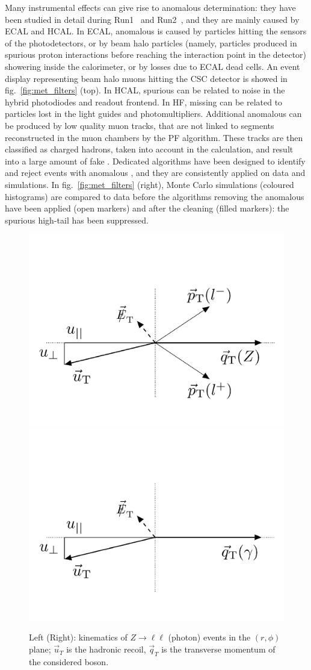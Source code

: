 \noindent Many instrumental effects can give rise to anomalous \MET determination: they have been studied in detail during Run1~\cite{Chatrchyan:2011tn,CMS:vgm} and Run2~\cite{CMS:2016ljj}, and they are mainly caused by ECAL and HCAL. In ECAL, anomalous \met is caused by particles hitting the sensors of the photodetectors, or by beam halo particles (namely, particles produced in spurious proton interactions before reaching the interaction point in the detector) showering inside the calorimeter, or by losses due to ECAL dead cells. An event display representing beam halo muons hitting the CSC detector is showed in fig.~\ref{fig:met_filters} (top). In HCAL, spurious \met can be related to noise in the hybrid photodiodes and readout frontend. In HF, missing \pt can be related to particles lost in the light guides and photomultipliers. Additional anomalous \MET can be produced by low quality muon tracks, that are not linked to segments reconstructed in the muon chambers by the PF algorithm. These tracks are then classified as charged hadrons, taken into account in the \met calculation, and result into a large amount of fake \MET. Dedicated algorithms have been designed to identify and reject events with anomalous \MET, and they are consistently applied on data and simulations. In fig.~\ref{fig:met_filters} (right), Monte Carlo simulations (coloured histograms) are compared to data before the algorithms removing the anomalous \MET have been applied (open markers) and after the cleaning (filled markers): the spurious high-\met tail has been suppressed.

\begin{figure}[!htb]
  \centering
    \includegraphics[width=.35\textwidth]{figures/MetPlots/u_comp_Z.png}%
    \includegraphics[width=.35\textwidth]{figures/MetPlots/u_comp_gamma.png}

  \caption{Left (Right): kinematics of $Z \rightarrow \ell \ell$ (photon) events in the $(r, \phi)$ plane; $\vec{u}_T$ is the hadronic recoil, $\vec{q}_T$ is the transverse momentum of the considered boson.}
  \label{fig:recoil}
\end{figure}

